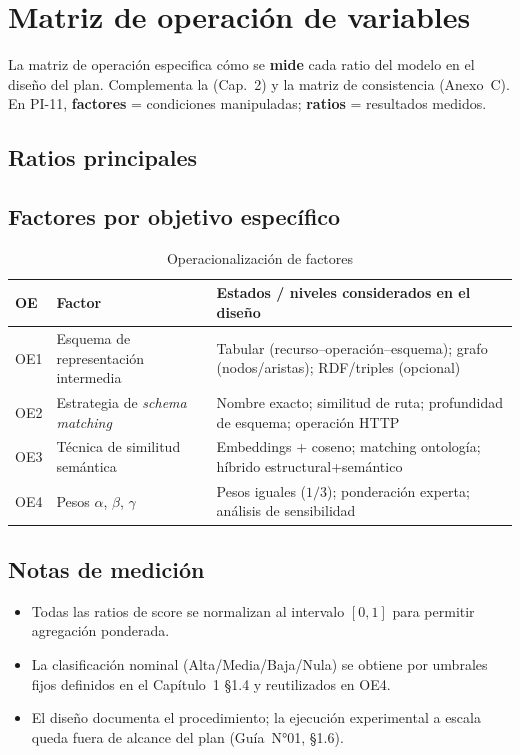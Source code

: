 \chapter{Matriz de operación de variables}
\label{anexo:d}

La matriz de operación especifica cómo se \textbf{mide} cada ratio del modelo en el diseño del plan.
Complementa la  (Cap.~2) y la matriz de consistencia (Anexo~C). En PI-11,
\textbf{factores} = condiciones manipuladas; \textbf{ratios} = resultados medidos.

\section{Ratios principales}

\small

\normalsize

\section{Factores por objetivo específico}

\begin{table}[H]
  \centering
  \caption{Operacionalización de factores}
  \label{tab:anexo-d-vi}
  \small
  \begin{tabular}{@{}p{}p{}p{}@{}}
    \toprule
    \textbf{OE} & \textbf{Factor} & \textbf{Estados / niveles considerados en el diseño} \\
    \midrule
    OE1 &
    Esquema de representación intermedia &
    Tabular (recurso--operación--esquema); grafo (nodos/aristas); RDF/triples (opcional) \\
    OE2 &
    Estrategia de \textit{schema matching} &
    Nombre exacto; similitud de ruta; profundidad de esquema; operación HTTP \\
    OE3 &
    Técnica de similitud semántica &
    Embeddings + coseno; matching ontología; híbrido estructural+semántico \\
    OE4 &
    Pesos $\alpha$, $\beta$, $\gamma$ &
    Pesos iguales ($1/3$); ponderación experta; análisis de sensibilidad \\
    \bottomrule
  \end{tabular}
\end{table}

\section{Notas de medición}

\begin{itemize}
  \item Todas las ratios de score se normalizan al intervalo $[0, 1]$ para permitir agregación
        ponderada.
  \item La clasificación nominal (Alta/Media/Baja/Nula) se obtiene por umbrales fijos definidos en
        el Capítulo~1 §1.4 y reutilizados en OE4.
  \item El diseño documenta el procedimiento; la ejecución experimental a escala queda fuera de
        alcance del plan (Guía~N°01, §1.6).
\end{itemize}
